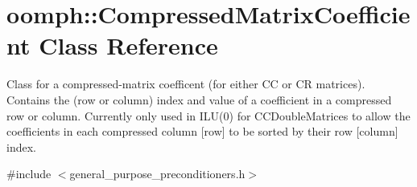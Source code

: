 \hypertarget{classoomph_1_1CompressedMatrixCoefficient}{}\section{oomph\+:\+:Compressed\+Matrix\+Coefficient Class Reference}
\label{classoomph_1_1CompressedMatrixCoefficient}


Class for a compressed-\/matrix coefficent (for either CC or CR matrices). Contains the (row or column) index and value of a coefficient in a compressed row or column. Currently only used in I\+L\+U(0) for C\+C\+Double\+Matrices to allow the coefficients in each compressed column \mbox{[}row\mbox{]} to be sorted by their row \mbox{[}column\mbox{]} index.  




{\ttfamily \#include $<$general\+\_\+purpose\+\_\+preconditioners.\+h$>$}

